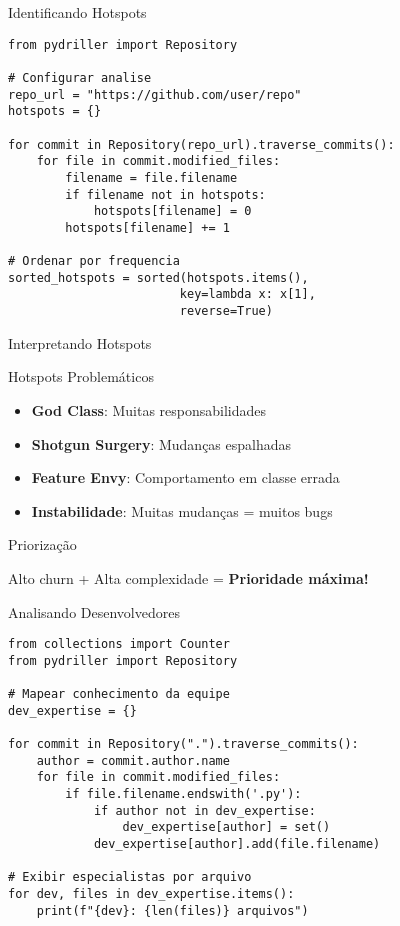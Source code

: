 \documentclass[aspectratio=169,11pt]{beamer}
\begin{document}
\begin{frame}[fragile]{Identificando Hotspots}
\begin{lstlisting}[style=pythoncode,basicstyle=\ttfamily\scriptsize]
from pydriller import Repository

# Configurar analise
repo_url = "https://github.com/user/repo"
hotspots = {}

for commit in Repository(repo_url).traverse_commits():
    for file in commit.modified_files:
        filename = file.filename
        if filename not in hotspots:
            hotspots[filename] = 0
        hotspots[filename] += 1

# Ordenar por frequencia
sorted_hotspots = sorted(hotspots.items(), 
                        key=lambda x: x[1], 
                        reverse=True)
\end{lstlisting}
\end{frame}

\begin{frame}{Interpretando Hotspots}
\begin{alertblock}{ Hotspots Problemáticos}
\begin{itemize}
    \item \textbf{God Class}: Muitas responsabilidades
    \item \textbf{Shotgun Surgery}: Mudanças espalhadas
    \item \textbf{Feature Envy}: Comportamento em classe errada
    \item \textbf{Instabilidade}: Muitas mudanças = muitos bugs
\end{itemize}
\end{alertblock}

\begin{block}{ Priorização}
\begin{center}
Alto churn + Alta complexidade = \textbf{Prioridade máxima!}
\end{center}
\end{block}
\end{frame}

\begin{frame}[fragile]{Analisando Desenvolvedores}
\begin{lstlisting}[style=pythoncode,basicstyle=\ttfamily\scriptsize]
from collections import Counter
from pydriller import Repository

# Mapear conhecimento da equipe
dev_expertise = {}

for commit in Repository(".").traverse_commits():
    author = commit.author.name
    for file in commit.modified_files:
        if file.filename.endswith('.py'):
            if author not in dev_expertise:
                dev_expertise[author] = set()
            dev_expertise[author].add(file.filename)

# Exibir especialistas por arquivo
for dev, files in dev_expertise.items():
    print(f"{dev}: {len(files)} arquivos")
\end{lstlisting}
\end{frame}
\end{document}
